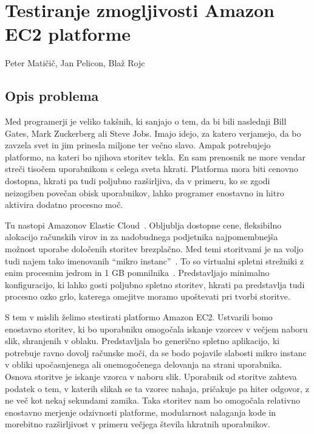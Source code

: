 \chapter[Testiranje zmogljivosti Amazon EC2 platforme (P. Matičič, J. Pelicon, B. Rojc)]{Testiranje zmogljivosti Amazon EC2 platforme}

\pagestyle{fancy}
\fancyhf{}
\fancyhead[LE,RO]{\thepage}
\fancyhead[RE,LO]{\leftmark}

\huge Peter Matičič, Jan Pelicon, Blaž Rojc
\normalsize
\bigskip

\section{Opis problema}

Med programerji je veliko takšnih, ki sanjajo o tem, da bi bili naslednji Bill Gates, Mark Zuckerberg ali Steve Jobs.
Imajo idejo, za katero verjamejo, da bo zavzela svet in jim prinesla miljone ter večno slavo.
Ampak potrebujejo platformo, na kateri bo njihova storitev tekla.
En sam prenosnik ne more vendar streči tisočem uporabnikom s celega sveta hkrati.
Platforma mora biti cenovno dostopna, hkrati pa tudi poljubno razširljiva, da v primeru, ko se zgodi neizogiben povečan obisk uporabnikov, lahko programer enostavno in hitro aktivira dodatno procesno moč.

Tu nastopi Amazonov Elastic Cloud~\cite{1_aws_amazon_ec2}.
Obljublja dostopne cene, fleksibilno alokacijo računskih virov in za nadobudnega podjetnika najpomembnejša možnost uporabe določenih storitev brezplačno.
Med temi storitvami je na voljo tudi najem tako imenovanih ``mikro instanc''~\cite{1_aws_amazon_free}. 
To so virtualni spletni strežniki z enim procesnim jedrom in 1 GB pomnilnika~\cite{1_aws_amazon_instances}.
Predstavljajo minimalno konfiguracijo, ki lahko gosti poljubno spletno storitev, hkrati pa predstavlja tudi procesno ozko grlo, katerega omejitve moramo upoštevati pri tvorbi storitve.

S tem v mislih želimo stestirati platformo Amazon EC2.
Ustvarili bomo enostavno storitev, ki bo uporabniku omogočala iskanje vzorcev v večjem naboru slik, shranjenih v oblaku.
Predstavljala bo generično spletno aplikacijo, ki potrebuje ravno dovolj računske moči, da se bodo pojavile slabosti mikro instanc v obliki upočasnjenega ali onemogočenega delovanja na strani uporabnika.
Osnova storitve je iskanje vzorca v naboru slik.
Uporabnik od storitve zahteva podatek o tem, v katerih slikah se ta vzorec nahaja, pričakuje pa hiter odgovor, z ne več kot nekaj sekundami zamika.
Taka storitev nam bo omogočala relativno enostavno merjenje odzivnosti platforme, modularnost nalaganja kode in morebitno razširljivost v primeru večjega števila hkratnih uporabnikov.

